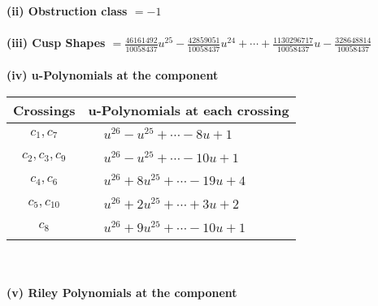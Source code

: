 \documentclass[1p]{elsarticle_modified}
\theoremstyle{definition}
\begin{document}
\flushleft \textbf{(ii) Obstruction class $= -1$}\\~\\
\flushleft \textbf{(iii) Cusp Shapes $= \frac{46161492}{10058437} u^{25}-\frac{42859051}{10058437} u^{24}+\cdots+\frac{1130296717}{10058437} u-\frac{328648814}{10058437}$}\\~\\
\newpage\renewcommand{\arraystretch}{1}
\flushleft \textbf{(iv) u-Polynomials at the component}\newline \\
\begin{tabular}{m{50pt}|m{274pt}}
Crossings & \hspace{64pt}u-Polynomials at each crossing \\
\hline $$\begin{aligned}c_{1},c_{7}\end{aligned}$$&$\begin{aligned}
&u^{26}- u^{25}+\cdots-8 u+1
\end{aligned}$\\
\hline $$\begin{aligned}c_{2},c_{3},c_{9}\end{aligned}$$&$\begin{aligned}
&u^{26}- u^{25}+\cdots-10 u+1
\end{aligned}$\\
\hline $$\begin{aligned}c_{4},c_{6}\end{aligned}$$&$\begin{aligned}
&u^{26}+8 u^{25}+\cdots-19 u+4
\end{aligned}$\\
\hline $$\begin{aligned}c_{5},c_{10}\end{aligned}$$&$\begin{aligned}
&u^{26}+2 u^{25}+\cdots+3 u+2
\end{aligned}$\\
\hline $$\begin{aligned}c_{8}\end{aligned}$$&$\begin{aligned}
&u^{26}+9 u^{25}+\cdots-10 u+1
\end{aligned}$\\
\hline
\end{tabular}\\~\\
\newpage\renewcommand{\arraystretch}{1}
\flushleft \textbf{(v) Riley Polynomials at the component}\newline \\
\end{document}

